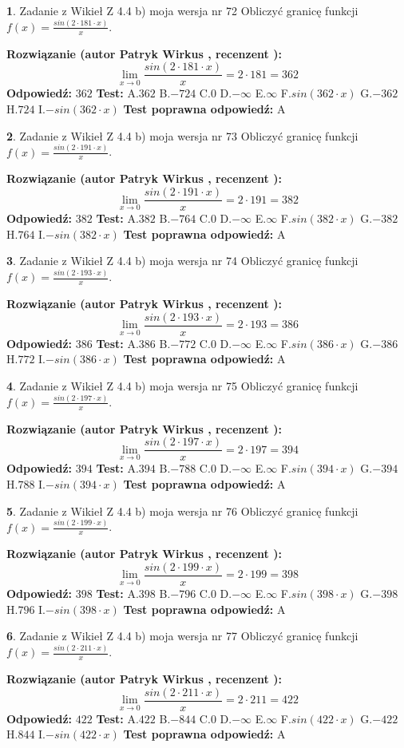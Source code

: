 \documentclass[12pt, a4paper]{article}
\theoremstyle{definition} %
\newtheorem{zad}{}
\newcommand{\zadStart}[1]{\begin{zad}#1\newline}
\newcommand{\zadStop}{\end{zad}}
\newcommand{\rozwStart}[2]{\noindent \textbf{Rozwiązanie (autor #1 , recenzent #2): }\newline}
\newcommand{\rozwStop}{\newline}
\newcommand{\odpStart}{\noindent \textbf{Odpowiedź:}\newline}
\newcommand{\odpStop}{\newline}
\newcommand{\testStart}{\noindent \textbf{Test:}\newline}
\newcommand{\testStop}{\newline}
\newcommand{\kluczStart}{\noindent \textbf{Test poprawna odpowiedź:}\newline}
\newcommand{\kluczStop}{\newline}
\begin{document}
\zadStart{Zadanie z Wikieł Z 4.4 b) moja wersja nr 72}
Obliczyć granicę funkcji $f(x)=\frac{sin(2 \cdot181\cdot x)}{x}$.
\zadStop
\rozwStart{Patryk Wirkus}{}
$$\lim\limits_{x\to 0}\frac{sin(2 \cdot 181\cdot x)}{x}=
2 \cdot 181 = 362$$
\rozwStop
\odpStart
$362$
\odpStop
\testStart
A.$362$
B.$-724$
C.$0$
D.$-\infty$
E.$\infty$
F.$sin(362\cdot x)$
G.$-362$
H.$724$
I.$-sin(362\cdot x)$
\testStop
\kluczStart
A
\kluczStop



\zadStart{Zadanie z Wikieł Z 4.4 b) moja wersja nr 73}
Obliczyć granicę funkcji $f(x)=\frac{sin(2 \cdot191\cdot x)}{x}$.
\zadStop
\rozwStart{Patryk Wirkus}{}
$$\lim\limits_{x\to 0}\frac{sin(2 \cdot 191\cdot x)}{x}=
2 \cdot 191 = 382$$
\rozwStop
\odpStart
$382$
\odpStop
\testStart
A.$382$
B.$-764$
C.$0$
D.$-\infty$
E.$\infty$
F.$sin(382\cdot x)$
G.$-382$
H.$764$
I.$-sin(382\cdot x)$
\testStop
\kluczStart
A
\kluczStop



\zadStart{Zadanie z Wikieł Z 4.4 b) moja wersja nr 74}
Obliczyć granicę funkcji $f(x)=\frac{sin(2 \cdot193\cdot x)}{x}$.
\zadStop
\rozwStart{Patryk Wirkus}{}
$$\lim\limits_{x\to 0}\frac{sin(2 \cdot 193\cdot x)}{x}=
2 \cdot 193 = 386$$
\rozwStop
\odpStart
$386$
\odpStop
\testStart
A.$386$
B.$-772$
C.$0$
D.$-\infty$
E.$\infty$
F.$sin(386\cdot x)$
G.$-386$
H.$772$
I.$-sin(386\cdot x)$
\testStop
\kluczStart
A
\kluczStop



\zadStart{Zadanie z Wikieł Z 4.4 b) moja wersja nr 75}
Obliczyć granicę funkcji $f(x)=\frac{sin(2 \cdot197\cdot x)}{x}$.
\zadStop
\rozwStart{Patryk Wirkus}{}
$$\lim\limits_{x\to 0}\frac{sin(2 \cdot 197\cdot x)}{x}=
2 \cdot 197 = 394$$
\rozwStop
\odpStart
$394$
\odpStop
\testStart
A.$394$
B.$-788$
C.$0$
D.$-\infty$
E.$\infty$
F.$sin(394\cdot x)$
G.$-394$
H.$788$
I.$-sin(394\cdot x)$
\testStop
\kluczStart
A
\kluczStop



\zadStart{Zadanie z Wikieł Z 4.4 b) moja wersja nr 76}
Obliczyć granicę funkcji $f(x)=\frac{sin(2 \cdot199\cdot x)}{x}$.
\zadStop
\rozwStart{Patryk Wirkus}{}
$$\lim\limits_{x\to 0}\frac{sin(2 \cdot 199\cdot x)}{x}=
2 \cdot 199 = 398$$
\rozwStop
\odpStart
$398$
\odpStop
\testStart
A.$398$
B.$-796$
C.$0$
D.$-\infty$
E.$\infty$
F.$sin(398\cdot x)$
G.$-398$
H.$796$
I.$-sin(398\cdot x)$
\testStop
\kluczStart
A
\kluczStop



\zadStart{Zadanie z Wikieł Z 4.4 b) moja wersja nr 77}
Obliczyć granicę funkcji $f(x)=\frac{sin(2 \cdot211\cdot x)}{x}$.
\zadStop
\rozwStart{Patryk Wirkus}{}
$$\lim\limits_{x\to 0}\frac{sin(2 \cdot 211\cdot x)}{x}=
2 \cdot 211 = 422$$
\rozwStop
\odpStart
$422$
\odpStop
\testStart
A.$422$
B.$-844$
C.$0$
D.$-\infty$
E.$\infty$
F.$sin(422\cdot x)$
G.$-422$
H.$844$
I.$-sin(422\cdot x)$
\testStop
\kluczStart
A
\kluczStop
\end{document}
